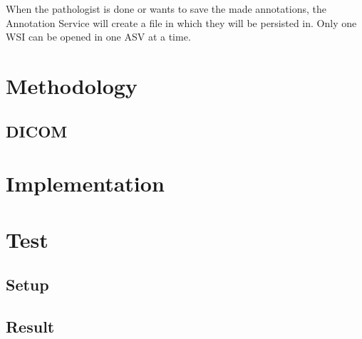 When the pathologist is done or wants to save the made annotations, the Annotation Service will create a file in which they will be persisted in. Only one WSI can be opened in one ASV at a time.

\section{Methodology}
\subsection{DICOM}
\section{Implementation}
\section{Test}
\subsection{Setup}
\subsection{Result}